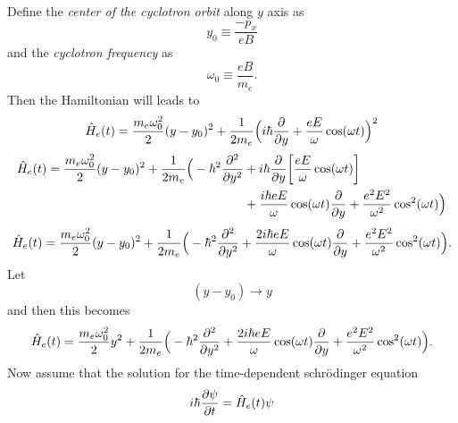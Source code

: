\documentclass[a4paper]{article}
\numberwithin{equation}{subsection}
\numberwithin{equation}{section}
\begin{document}
Define the \textit{center of the cyclotron orbit} along $y$ axis as
\begin{equation} \label{1.11}
  y_0 \equiv \frac{-p_x}{eB}
\end{equation}
and the \textit{cyclotron frequency} as
\begin{equation} \label{1.12}
  \omega_0 \equiv \frac{eB}{m_e}.
\end{equation}
Then the Hamiltonian will leads to
\begin{equation} \label{1.13}
    \hat{H}_e(t) =
      \frac{m_e \omega_0^2}{2}(y-y_0)^2 +
      \frac{1}{2m_e}\Big(i\hbar \pdv{y}+\frac{eE}{\omega}\cos(\omega t)\Big)^2
\end{equation}
\begin{equation} \label{1.14}
  \begin{aligned}
    \hat{H}_e(t) =
      \frac{m_e \omega_0^2}{2}(y-y_0)^2 +
      \frac{1}{2m_e}\Big(
      -\hbar^2 \pdv[2]{y} & +
      i\hbar \pdv{y}\bigg[\frac{eE}{\omega}\cos(\omega t) \bigg] \\ & +
      \frac{i\hbar eE}{\omega}\cos(\omega t) \pdv{y}+
      \frac{e^2E^2}{\omega^2}\cos[2](\omega t)
      \Big)
  \end{aligned}
\end{equation}
\begin{equation} \label{1.15}
  \begin{aligned}
    \hat{H}_e(t) =
      \frac{m_e \omega_0^2}{2}(y-y_0)^2 +
      \frac{1}{2m_e}\Big(
      -\hbar^2 \pdv[2]{y} +
      \frac{2i\hbar eE}{\omega}\cos(\omega t) \pdv{y}+
      \frac{e^2E^2}{\omega^2}\cos[2](\omega t)
      \Big).
  \end{aligned}
\end{equation}
Let
\begin{equation} \label{1.16}
    (y - y_0) \rightarrow y
\end{equation}
and then this becomes
\begin{equation} \label{1.17}
  \begin{aligned}
    \hat{H}_e(t) =
      \frac{m_e \omega_0^2}{2}y^2 +
      \frac{1}{2m_e}\Big(
      -\hbar^2 \pdv[2]{y} +
      \frac{2i\hbar eE}{\omega}\cos(\omega t) \pdv{y}+
      \frac{e^2E^2}{\omega^2}\cos[2](\omega t)
      \Big).
  \end{aligned}
\end{equation}
Now assume that the solution for the time-dependent schrödinger equation
\begin{equation} \label{1.18}
    i \hbar \pdv{\psi}{t} = \hat{H}_e(t)\psi
\end{equation}
\end{document}
